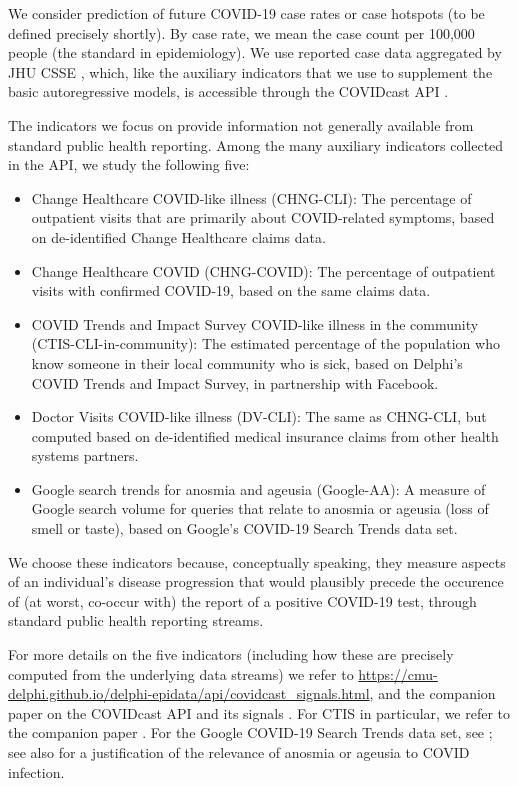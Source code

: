 \documentclass[9pt,twocolumn,twoside,lineno]{pnas-new}
\begin{document}
We consider prediction of future COVID-19 case rates or case hotspots (to be
defined precisely shortly).  By case rate, we mean the case count per 100,000
people (the standard in epidemiology).  We use reported case data aggregated by 
JHU CSSE \cite{Dong:2020}, which, like the auxiliary indicators that we use to
supplement the basic autoregressive models, is accessible through the COVIDcast
API \cite{CovidcastAPI}. 

The indicators we focus on provide information not generally available from
standard public health reporting. Among the many auxiliary indicators collected
in the API, we study the following five:  
\begin{itemize}
\item Change Healthcare COVID-like illness (CHNG-CLI): The percentage of
  outpatient visits that are primarily about COVID-related symptoms, based on
  de-identified Change Healthcare claims data.
\item Change Healthcare COVID (CHNG-COVID): The percentage of outpatient visits
  with confirmed COVID-19, based on the same claims data.
\item COVID Trends and Impact Survey COVID-like illness in the community
  (CTIS-CLI-in-community): The estimated percentage of the population who know
  someone in their local community who is sick, based on Delphi's COVID Trends
  and Impact Survey, in partnership with Facebook.
\item Doctor Visits COVID-like illness (DV-CLI): The same as CHNG-CLI, but
  computed based on de-identified medical insurance claims from other health
  systems partners.  
\item Google search trends for anosmia and ageusia (Google-AA): A measure of  
  Google search volume for queries that relate to anosmia or ageusia (loss of
  smell or taste), based on Google's COVID-19 Search Trends data set.
\end{itemize}
We choose these indicators because, conceptually speaking, they measure aspects
of an individual's disease progression that would plausibly precede the  
occurence of (at worst, co-occur  with) the report of a positive COVID-19 test,
through standard public health reporting streams. 

For more details on the five indicators (including how these are precisely
computed from the underlying data streams) we refer to
\url{https://cmu-delphi.github.io/delphi-epidata/api/covidcast_signals.html},
and the companion paper on the COVIDcast API and its signals
\cite{Reinhart:2021}. For CTIS in particular, we refer to the companion paper
\cite{Salomon:2021}. For the Google COVID-19 Search Trends data set, see
\cite{GoogleSymptoms}; see also \cite{Klopfen:2020, Vaira:2020} for a
justification of the relevance of anosmia or ageusia to COVID infection.   
\end{document}
